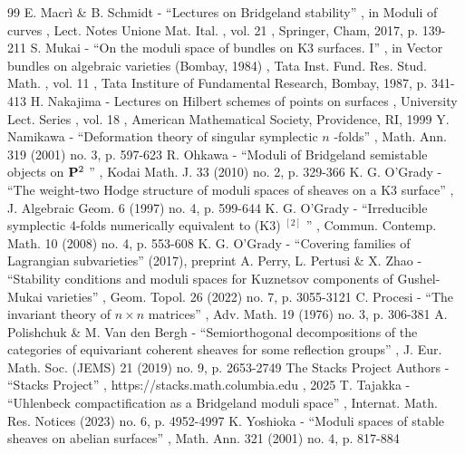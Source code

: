 \documentclass[11pt]{article}
\theoremstyle{definition}
\begin{document}
\begin{thebibliography}{99}
 E. Macrì \& B. Schmidt - “Lectures on Bridgeland stability” , in Moduli of curves , Lect. Notes Unione Mat. Ital. , vol. 21 , Springer, Cham, 2017, p. 139-211
 S. Mukai - “On the moduli space of bundles on K3 surfaces. I” , in Vector bundles on algebraic varieties (Bombay, 1984) , Tata Inst. Fund. Res. Stud. Math. , vol. 11 , Tata Institure of Fundamental Research, Bombay, 1987, p. 341-413
 H. Nakajima - Lectures on Hilbert schemes of points on surfaces , University Lect. Series , vol. 18 , American Mathematical Society, Providence, RI, 1999
 Y. Namikawa - “Deformation theory of singular symplectic $n$ -folds” , Math. Ann. 319 (2001) no. 3, p. 597-623
 R. Ohkawa - “Moduli of Bridgeland semistable objects on ${\bf P}^2$ ” , Kodai Math. J. 33 (2010) no. 2, p. 329-366
 K. G. O’Grady - “The weight-two Hodge structure of moduli spaces of sheaves on a K3 surface” , J. Algebraic Geom. 6 (1997) no. 4, p. 599-644
 K. G. O’Grady - “Irreducible symplectic 4-folds numerically equivalent to (K3) $^{[2]}$ ” , Commun. Contemp. Math. 10 (2008) no. 4, p. 553-608
 K. G. O’Grady - “Covering families of Lagrangian subvarieties” (2017), preprint
 A. Perry, L. Pertusi \& X. Zhao - “Stability conditions and moduli spaces for Kuznetsov components of Gushel-Mukai varieties” , Geom. Topol. 26 (2022) no. 7, p. 3055-3121
 C. Procesi - “The invariant theory of $n\times n$ matrices” , Adv. Math. 19 (1976) no. 3, p. 306-381
 A. Polishchuk \& M. Van den Bergh - “Semiorthogonal decompositions of the categories of equivariant coherent sheaves for some reflection groups” , J. Eur. Math. Soc. (JEMS) 21 (2019) no. 9, p. 2653-2749
 The Stacks Project Authors - “Stacks Project” , https://stacks.math.columbia.edu , 2025
 T. Tajakka - “Uhlenbeck compactification as a Bridgeland moduli space” , Internat. Math. Res. Notices (2023) no. 6, p. 4952-4997
 K. Yoshioka - “Moduli spaces of stable sheaves on abelian surfaces” , Math. Ann. 321 (2001) no. 4, p. 817-884
\end{thebibliography}
\end{document}
